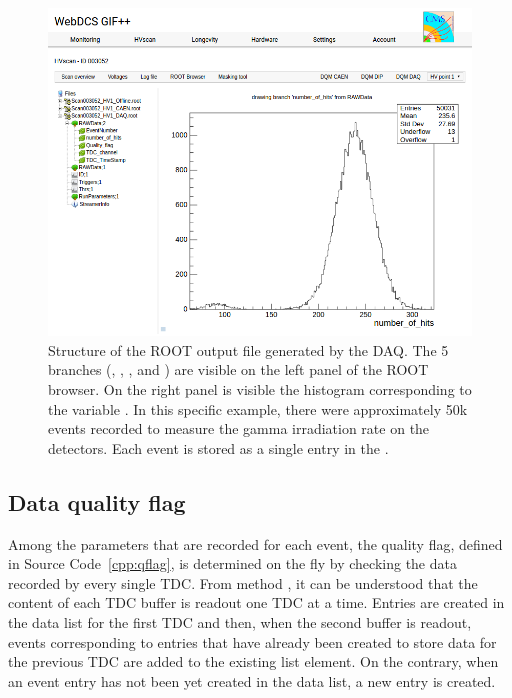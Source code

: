     \begin{figure}[H]
		\centering
		\includegraphics[width = \plotwidth]{fig/app1/webDCS-ROOT-browser.png}
		\caption{\label{fig:ROOTfile} Structure of the ROOT output file generated by the DAQ. The 5 branches (, , ,  and ) are visible on the left panel of the ROOT browser. On the right panel is visible the histogram corresponding to the variable . In this specific example, there were approximately 50k events recorded to measure the gamma irradiation rate on the detectors. Each event is stored as a single entry in the .}
	\end{figure}
	
	\subsection{Data quality flag}
	\label{app1:ssec:QFlag}
	
	Among the parameters that are recorded for each event, the quality flag, defined in Source Code~\ref{cpp:qflag}, is determined on the fly by checking the data recorded by every single TDC. From method , it can be understood that the content of each TDC buffer is readout one TDC at a time. Entries are created in the data list for the first TDC and then, when the second buffer is readout, events corresponding to entries that have already been created to store data for the previous TDC are added to the existing list element. On the contrary, when an event entry has not been yet created in the data list, a new entry is created.\\
	
